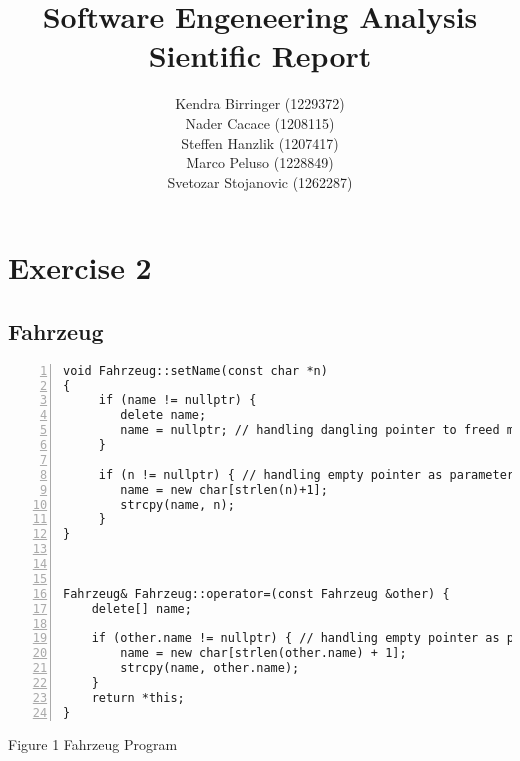 \documentclass{llncs}
\begin{document}
\makeatletter
\renewcommand\subsubsection{\@startsection{subsubsection}{2}{\z@}%
                       {-18\p@ \@plus -4\p@ \@minus -4\p@}%
                       {\lineskip}%
                       {\normalfont\normalsize\bfseries\boldmath}}
\makeatother


\title{Software Engeneering Analysis Sientific Report}

\author{Kendra Birringer (1229372) \\ Nader Cacace (1208115) \\ Steffen Hanzlik (1207417) \\ Marco Peluso (1228849) \\ Svetozar Stojanovic (1262287)}


\maketitle              %
\section{Exercise 2}
\subsection{Fahrzeug }

\begin{lstlisting}[basicstyle=\footnotesize\ttfamily, numbers=left, stepnumber=1, numberstyle = \normalsize]
void Fahrzeug::setName(const char *n)
{
     if (name != nullptr) {
     	delete name;
     	name = nullptr; // handling dangling pointer to freed memory
     }

     if (n != nullptr) { // handling empty pointer as parameter, preventing strlen from crashing
     	name = new char[strlen(n)+1];
     	strcpy(name, n);
     }
}



Fahrzeug& Fahrzeug::operator=(const Fahrzeug &other) {
	delete[] name;

	if (other.name != nullptr) { // handling empty pointer as parameter, preventing strlen from crashing
		name = new char[strlen(other.name) + 1];
		strcpy(name, other.name);
	}
	return *this;
}

\end{lstlisting}
\scriptsize{Figure 1 Fahrzeug Program}\newline
\end{document}
